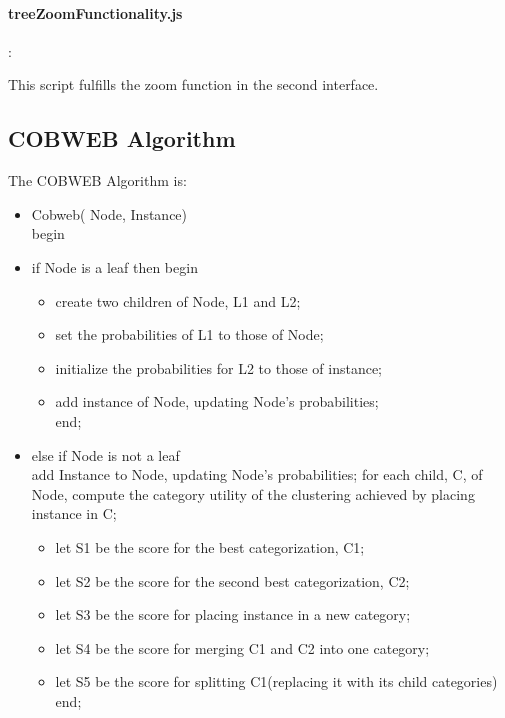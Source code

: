 \paragraph{treeZoomFunctionality.js}:

This script fulfills the zoom function in the second interface.
    
\subsection{COBWEB Algorithm}
    The COBWEB Algorithm is:
    \begin{itemize}\itemsep-3pt
    \item 
    Cobweb( Node, Instance)\\
    begin\\
    \item if Node is a leaf then begin\\
    		\begin{itemize}\itemsep-3pt
           	\item create two children of Node, L1 and L2;\\
           	\item set the probabilities of L1 to those of Node;\\
          	\item initialize the probabilities for L2 to those of instance;\\
           	\item add instance of Node, updating Node’s probabilities;\\
            end;
            \end{itemize}
    \item  else if Node is not a leaf\\   
      add Instance to Node, updating Node’s probabilities;
      for each child, C, of Node, compute the category utility of the clustering achieved by placing instance in C;   
      \begin{itemize}\itemsep-3pt
      \item let S1 be the score for the best categorization, C1;\\
      \item let S2 be the score for the second best categorization, C2;\\
      \item let S3 be the score for placing instance in a new category;\\
      \item let S4 be the score for merging C1 and C2 into one category;\\
      \item let S5 be the score for splitting C1(replacing it with its child categories)\\
      end;
      \end{itemize}
      

\end{itemize}
